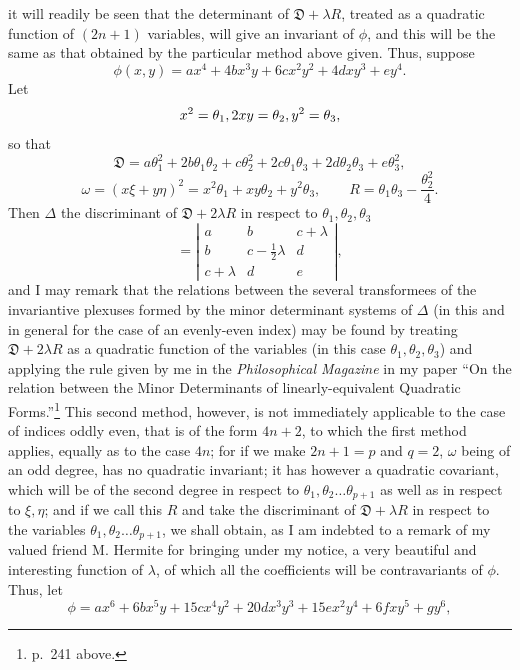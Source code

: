 \documentclass[11pt]{article}
\newcommand{\sourcepage}[1]{\marginpar{\scriptsize p.~#1}}
\begin{document}
{{\sourcepage{296}
it will readily be seen that the determinant of $\mathfrak D+\lambda R$, treated as a quadratic function of $(2n+1)$ variables, will give an invariant of $\phi$, and this will be the same as that obtained by the particular method above given. Thus, suppose
\[
\phi(x,y)=ax^4+4bx^3y+6cx^2y^2+4dxy^3+ey^4.
\]
Let
\[
x^2=\theta_1,\\ 2xy=\theta_2,\\ y^2=\theta_3,
\]
so that
\[
\mathfrak D=a\theta_1^2+2b\theta_1\theta_2+c\theta_2^2+2c\theta_1\theta_3+2d\theta_2\theta_3+e\theta_3^2,
\]
\[
\omega=(x\xi+y\eta)^2=x^2\theta_1+xy\theta_2+y^2\theta_3,
\qquad
R=\theta_1\theta_3-\frac{\theta_2^2}{4}.
\]
Then $\Delta$ the discriminant of $\mathfrak D+2\lambda R$ in respect to $\theta_1,\theta_2,\theta_3$
\[
=\left|\begin{array}{ccc}
a&b&c+\lambda\\
b&c-\frac12\lambda&d\\
c+\lambda&d&e
\end{array}\right|,
\]
and I may remark that the relations between the several transformees of the invariantive plexuses formed by the minor determinant systems of $\Delta$ (in this and in general for the case of an evenly-even index) may be found by treating $\mathfrak D+2\lambda R$ as a quadratic function of the variables (in this case $\theta_1,\theta_2,\theta_3$) and applying the rule given by me in the \emph{Philosophical Magazine} in my paper ``On the relation between the Minor Determinants of linearly-equivalent Quadratic Forms.''\footnote{p.~241 above.} This second method, however, is not immediately applicable to the case of indices oddly even, that is of the form $4n+2$, to which the first method applies, equally as to the case $4n$; for if we make $2n+1=p$ and $q=2$, $\omega$ being of an odd degree, has no quadratic invariant; it has however a quadratic covariant, which will be of the second degree in respect to $\theta_1,\theta_2\ldots\theta_{p+1}$ as well as in respect to $\xi,\eta$; and if we call this $R$ and take the discriminant of $\mathfrak D+\lambda R$ in respect to the variables $\theta_1,\theta_2\ldots\theta_{p+1}$, we shall obtain, as I am indebted to a remark of my valued friend M. Hermite for bringing under my notice, a very beautiful and interesting function of $\lambda$, of which all the coefficients will be contravariants of $\phi$. Thus, let
\[
\phi=ax^6+6bx^5y+15cx^4y^2+20dx^3y^3+15ex^2y^4+6fxy^5+gy^6,
\]

}}
\end{document}

